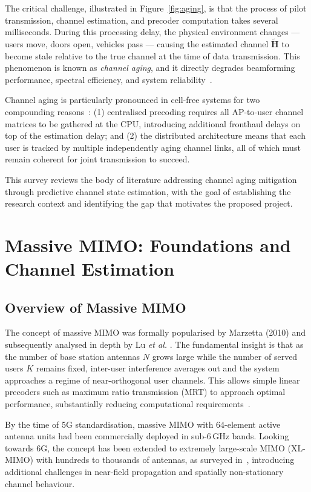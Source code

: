 \documentclass[12pt,a4paper]{article}
\newcommand{\bH}{\mathbf{H}}
\begin{document}
The critical challenge, illustrated in Figure~\ref{fig:aging}, is that
the process of pilot transmission, channel estimation, and precoder
computation takes several milliseconds. During this processing delay,
the physical environment changes --- users move, doors open, vehicles
pass --- causing the estimated channel $\tilde{\bH}$ to become stale
relative to the true channel at the time of data transmission. This
phenomenon is known as \textit{channel aging}, and it directly degrades
beamforming performance, spectral efficiency, and system
reliability~\cite{Zheng2021impact}.

Channel aging is particularly pronounced in cell-free systems for two
compounding reasons~\cite{Freitas2025ekf}: (1) centralised precoding
requires all AP-to-user channel matrices to be gathered at the CPU,
introducing additional fronthaul delays on top of the estimation delay;
and (2) the distributed architecture means that each user is tracked
by multiple independently aging channel links, all of which must remain
coherent for joint transmission to succeed.

This survey reviews the body of literature addressing channel aging
mitigation through predictive channel state estimation, with the goal
of establishing the research context and identifying the gap that
motivates the proposed project.

\section{Massive MIMO: Foundations and Channel Estimation}

\subsection{Overview of Massive MIMO}

The concept of massive MIMO was formally popularised by Marzetta (2010)
and subsequently analysed in depth by Lu \textit{et al.}
\cite{Lu2014overview}. The fundamental insight is that as the number of
base station antennas $N$ grows large while the number of served users
$K$ remains fixed, inter-user interference averages out and the system
approaches a regime of near-orthogonal user channels. This allows simple
linear precoders such as maximum ratio transmission (MRT) to approach
optimal performance, substantially reducing computational
requirements~\cite{Lu2014overview}.

By the time of 5G standardisation, massive MIMO with 64-element active
antenna units had been commercially deployed in sub-6\,GHz bands.
Looking towards 6G, the concept has been extended to extremely
large-scale MIMO (XL-MIMO) with hundreds to thousands of antennas,
as surveyed in~\cite{Wang2024tutorial}, introducing additional
challenges in near-field propagation and spatially non-stationary
channel behaviour.
\end{document}
